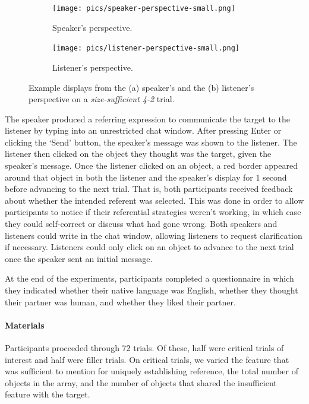 \documentclass[11pt]{article}
\begin{document}
\begin{figure}
\begin{subfigure}{.5\textwidth}
\texttt{[image: pics/speaker-perspective-small.png]}
\caption{Speaker's perspective.}
\label{fig:speakerpersp}
\end{subfigure}
\begin{subfigure}{.5\textwidth}
\texttt{[image: pics/listener-perspective-small.png]}
\caption{Listener's perspective.}
\label{fig:listenerpersp}
\end{subfigure}
\caption{Example displays from the  (a) speaker's and the (b) listener's perspective on a \emph{size-sufficient 4-2} trial.}
\label{fig:speakerlistenerperspective}
\end{figure}

The speaker produced a referring expression to communicate the target to the listener by typing into an unrestricted chat window. After pressing Enter or clicking the `Send' button, the speaker's message was shown to the listener. The listener then clicked on the object they thought was the target, given the speaker's message.  Once the listener clicked on an object, a red border appeared around that object in both the listener and the speaker's display for 1 second before advancing to the next trial. That is, both participants received feedback about whether the intended referent was selected. This was done in order to allow participants to notice if their referential strategies weren't working, in which case they could self-correct or discuss what had gone wrong. Both speakers and listeners could write in the chat window, allowing listeners to request clarification if necessary. Listeners could only click on an object to advance to the next trial once the speaker sent an initial message. 

At the end of the experiments, participants completed a questionnaire in which they indicated whether their native language was English, whether they thought their partner was human, and whether they liked their partner.


\paragraph{Materials}

Participants proceeded through 72 trials. Of these, half were critical trials of interest and half were filler trials. On critical trials, we varied the feature that was sufficient to mention for uniquely establishing reference, the total number of objects in the array, and  the number of objects that shared the insufficient feature with the target. 
\end{document}
